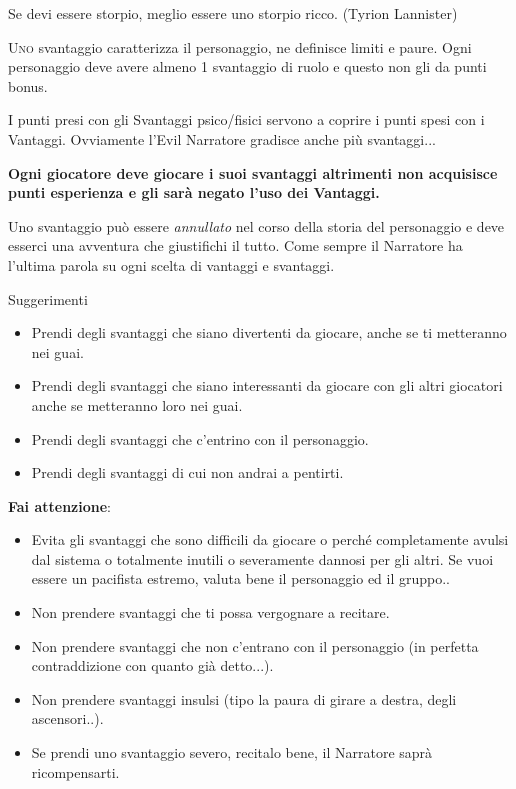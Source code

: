 \documentclass[a4paper,twoside,openany]{book}
\begin{document}
\begin{changemargin}{0.3cm}{0.3cm}\begin{enfasi}{Se devi essere storpio, meglio essere uno storpio ricco. (Tyrion Lannister)}\end{enfasi}\end{changemargin}\medskip

\begin{multicols}{2}

\lettrine[lines=2, lhang=0.33, loversize=0.25, findent=1.5em]{U}{no} svantaggio caratterizza il personaggio, ne definisce limiti e paure. Ogni personaggio deve avere almeno 1 svantaggio di ruolo e questo non gli da punti bonus.

I punti presi con gli Svantaggi psico/fisici servono a coprire i punti spesi con i Vantaggi. Ovviamente l'Evil Narratore gradisce anche più svantaggi...

\textbf{Ogni giocatore deve giocare i suoi svantaggi altrimenti non acquisisce punti esperienza e gli sarà negato l'uso dei Vantaggi.}

Uno svantaggio può essere \emph{annullato} nel corso della storia del personaggio e deve esserci una avventura che giustifichi il tutto. Come sempre il Narratore ha l'ultima parola su ogni scelta di vantaggi e svantaggi.

\bigskip

Suggerimenti
\begin{itemize}[leftmargin=*]
\item
Prendi degli svantaggi che siano divertenti da giocare, anche se ti metteranno nei guai.
\item
Prendi degli svantaggi che siano interessanti da giocare con gli altri giocatori anche se metteranno loro nei guai.
\item
Prendi degli svantaggi che c'entrino con il personaggio.
\item
Prendi degli svantaggi di cui non andrai a pentirti.
\end{itemize}

\textbf{Fai attenzione}:

\begin{itemize}[leftmargin=*]
\item
Evita gli svantaggi che sono difficili da giocare o perché completamente avulsi dal sistema o totalmente inutili o severamente dannosi per gli altri. Se vuoi essere un pacifista estremo, valuta bene il personaggio ed il gruppo..
\item
Non prendere svantaggi che ti possa vergognare a recitare.
\item
Non prendere svantaggi che non c'entrano con il personaggio (in perfetta contraddizione con quanto già detto...).
\item
Non prendere svantaggi insulsi (tipo la paura di girare a destra, degli ascensori..).
\item
Se prendi uno svantaggio severo, recitalo bene, il Narratore saprà ricompensarti.
\end{itemize}


\end{multicols}
\end{document}
